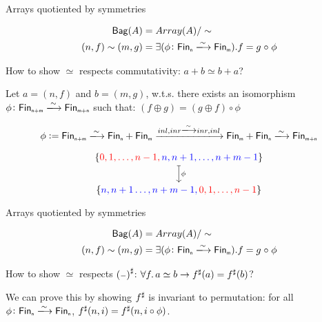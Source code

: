 \documentclass[9pt]{beamer}
\begin{document}
\begin{frame}[fragile]{Arrays quotiented by symmetries}
    \begin{dblock}
        \vspace{-0.4cm}
        \begin{align*}
            \type{Bag}(A) &= Array(A) / \sim          
            \\
            (n,f) \sim (m,g) &= 
                \exis{\phi\colon \Fin[n]\xto{\sim}\Fin[m]}{f = g \comp \phi}
        \end{align*}
    \end{dblock}
    How to show $\simeq$ respects \alert{commutativity}: $a + b \simeq b + a$?

    Let $a = (n , f)$ and $b = (m , g)$, w.t.s. there exists an isomorphism $\phi\colon \Fin[n+m]\xto{\sim}\Fin[m+n]$
    such that: $(f \oplus g) = (g \oplus f) \circ \phi$

    \begin{align*}
        \phi := \Fin[n+m] \xto{\sim} \Fin[n] + \Fin[m] \xto{inl,inr \xto{\sim} inr,inl} \Fin[m] + \Fin[n] \xto{\sim} \Fin[m+n] \\
    \end{align*}

        \vspace{-0.6cm}

\[\begin{tikzcd}[ampersand replacement=\&,cramped]
	{\{\color{red}0,1,\dots,n-1, \color{blue} n,n+1,\dots,n+m-1 \color{black}\}} \\
	{ \{\color{blue}n,n+1\dots,n+m-1, \color{red}0,1,\dots,n-1 \color{black}\}}
    \arrow["\phi", maps to, from=1-1, to=2-1]
\end{tikzcd}\]
    
\end{frame}

\begin{frame}[fragile]{Arrays quotiented by symmetries}
    \begin{dblock}
        \vspace{-0.4cm}
        \begin{align*}
            \type{Bag}(A) &= Array(A) / \sim          
            \\
            (n,f) \sim (m,g) &= 
                \exis{\phi\colon \Fin[n]\xto{\sim}\Fin[m]}{f = g \comp \phi}
        \end{align*}
    \end{dblock}
    How to show $\simeq$ respects ${({\scriptstyle{-}})}^{\sharp}$: $\forall f. \, a \simeq b \to {f}^{\sharp}(a) = {f}^{\sharp}(b)$?

    We can prove this by showing ${f}^{\sharp}$ is \alert{invariant to permutation}: for all $\phi\colon \Fin[n]\xto{\sim}\Fin[n]$,
    ${f}^{\sharp}(n, i) = {f}^{\sharp}(n, i \circ \phi)$.
    
\end{frame}
\end{document}
